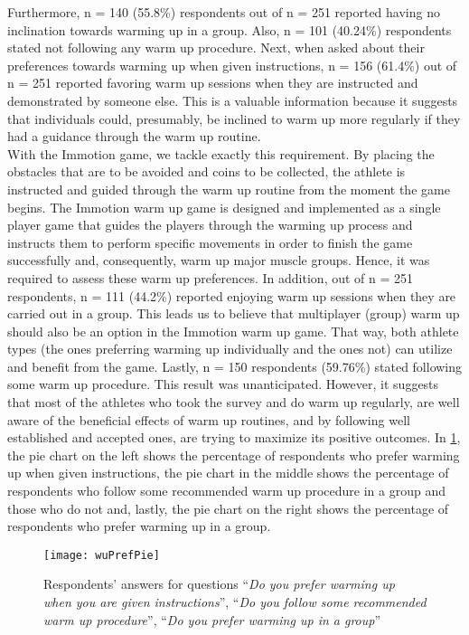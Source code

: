 Furthermore, n = 140 (55.8\%) respondents out of n = 251 reported having no inclination towards warming up in a group. Also, n = 101 (40.24\%) respondents stated not following any warm up procedure. Next, when asked about their preferences towards warming up when given instructions, n = 156 (61.4\%) out of n = 251 reported favoring warm up sessions when they are instructed and demonstrated by someone else. This is a valuable information because it suggests that individuals could, presumably, be inclined to warm up more regularly if they had a guidance through the warm up routine. \\With the Immotion game, we tackle exactly this requirement. By placing the obstacles that are to be avoided and coins to be collected, the athlete is instructed and guided through the warm up routine from the moment the game begins. The Immotion warm up game is designed and implemented as a single player game that guides the players through the warming up process and instructs them to perform specific movements in order to finish the game successfully and, consequently, warm up major muscle groups. Hence, it was required to assess these warm up preferences. In addition, out of n = 251 respondents, n = 111 (44.2\%) reported enjoying warm up sessions when they are carried out in a group. This leads us to believe that multiplayer (group) warm up should also be an option in the Immotion warm up game. That way, both athlete types (the ones preferring warming up individually and the ones not) can utilize and benefit from the game. Lastly, n = 150 respondents (59.76\%) stated following some warm up procedure. This result was unanticipated. However, it suggests that most of the athletes who took the survey and do warm up regularly, are well aware of the beneficial effects of warm up routines, and by following well established and accepted ones, are trying to maximize its positive outcomes. In \ref{fig:wuPrefPie}, the pie chart on the left shows the percentage of respondents who prefer warming up when given instructions, the pie chart in the middle shows the percentage of respondents who follow some recommended warm up procedure in a group and those who do not and, lastly, the pie chart on the right shows the percentage of respondents who prefer warming up in a group.\\
\begin{figure}[h]
    \centering
    \texttt{[image: wuPrefPie]}
    \caption{Respondents' answers for questions ``\textit{Do you prefer warming up when you are given instructions}'', ``\textit{Do you follow some recommended warm up procedure}'', ``\textit{Do you prefer warming up in a group}''}
    \label{fig:wuPrefPie}
\end{figure}\\
